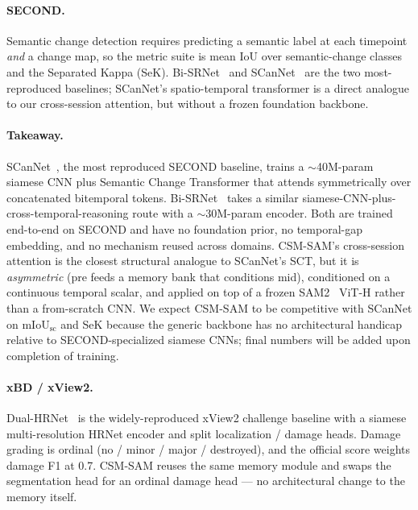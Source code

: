 
\paragraph{SECOND.} Semantic change detection requires predicting a
semantic label at each timepoint \emph{and} a change map, so the
metric suite is mean IoU over semantic-change classes and the
Separated Kappa (SeK). Bi-SRNet~\cite{ding2022bisrnet} and
SCanNet~\cite{ding2024scannet} are the two most-reproduced
baselines; SCanNet's spatio-temporal transformer is a direct
analogue to our cross-session attention, but without a frozen
foundation backbone.

\paragraph{Takeaway.} SCanNet~\cite{ding2024scannet}, the most
reproduced SECOND baseline, trains a $\sim$40M-param siamese CNN plus
Semantic Change Transformer that attends symmetrically over
concatenated bitemporal tokens. Bi-SRNet~\cite{ding2022bisrnet} takes
a similar siamese-CNN-plus-cross-temporal-reasoning route with a
$\sim$30M-param encoder. Both are trained end-to-end on SECOND and
have no foundation prior, no temporal-gap embedding, and no mechanism
reused across domains. CSM-SAM's cross-session attention is the
closest structural analogue to SCanNet's SCT, but it is
\emph{asymmetric} (pre feeds a memory bank that conditions mid),
conditioned on a continuous temporal scalar, and applied on top of a
frozen SAM2~\cite{ravi2024sam2} ViT-H rather than a from-scratch CNN.
We expect CSM-SAM to be competitive with SCanNet on mIoU$_\text{sc}$
and SeK because the generic backbone has no architectural handicap
relative to SECOND-specialized siamese CNNs; final numbers will be
added upon completion of training.


\paragraph{xBD / xView2.} Dual-HRNet~\cite{gupta2019xbd} is the
widely-reproduced xView2 challenge baseline with a siamese
multi-resolution HRNet encoder and split localization / damage
heads. Damage grading is ordinal (no / minor / major / destroyed),
and the official score weights damage F1 at 0.7. CSM-SAM reuses the
same memory module and swaps the segmentation head for an ordinal
damage head --- no architectural change to the memory itself.

